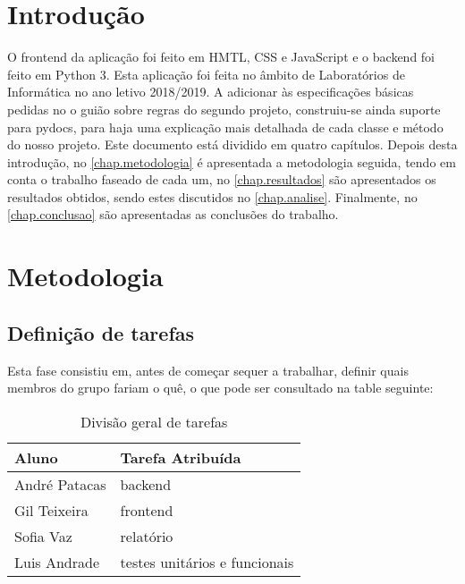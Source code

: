 \documentclass{report}
\begin{document}
\clearpage
{}

\chapter{Introdução}
\label{chap.introducao}

O frontend da aplicação foi feito em HMTL, CSS e JavaScript e o backend foi feito em Python 3. Esta aplicação foi feita no âmbito de Laboratórios de Informática no ano letivo 2018/2019.
A adicionar às especificações básicas pedidas no o guião sobre regras do segundo projeto, construiu-se ainda suporte para pydocs, para haja uma explicação mais detalhada de cada classe e método do nosso projeto.
Este documento está dividido em quatro capítulos.
Depois desta introdução,
no \autoref{chap.metodologia} é apresentada a metodologia seguida, tendo em conta o trabalho faseado de cada um, 
no \autoref{chap.resultados} são apresentados os resultados obtidos,
sendo estes discutidos no \autoref{chap.analise}.
Finalmente, no \autoref{chap.conclusao} são apresentadas
as conclusões do trabalho.

\chapter{Metodologia}
\label{chap.metodologia}
\section{Definição de tarefas}
Esta fase consistiu em, antes de começar sequer a trabalhar, definir quais membros do grupo fariam o quê, o que pode ser consultado na table seguinte: 
\begin{table}[h!]
\begin{center}
\caption{Divisão geral de tarefas}
\label{tab:table1}
\begin{tabular}{l|l}
\hline
\multicolumn{1}{|l|}{Aluno} & \multicolumn{1}{l|}{Tarefa Atribuída} \\ \hline
            André Patacas   & backend                               \\ 
            Gil Teixeira      & frontend                               \\
            Sofia Vaz         & relatório                                \\
            Luis Andrade    & testes unitários e funcionais                     
\end{tabular}
\end{center}
\end{table}
\end{document}
